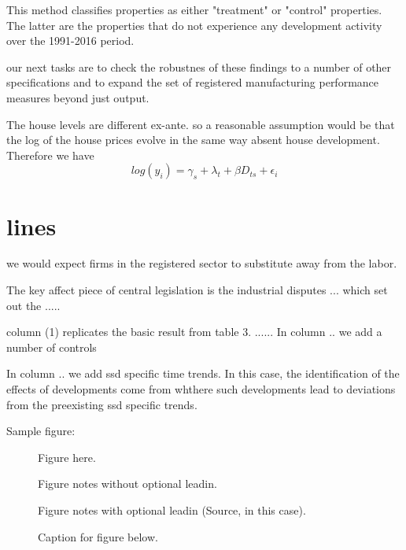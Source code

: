 \documentclass[AEJ]{AEA}
\begin{document}
This method classifies properties as either "treatment" or "control" properties. The latter are the properties that do not experience any development activity over the 1991-2016  period. 


our next tasks are to check the robustnes of these findings to a number of other specifications and to expand the set of registered manufacturing performance measures beyond just output.




The house levels are different ex-ante. so a reasonable assumption would be that the log of the house prices evolve in the same way absent house development. Therefore we have $$ log(y_i) = \gamma_s + \lambda_t +\beta D_{ts} + \epsilon_i$$




\section{lines}
we would expect firms in the registered sector to substitute away from the labor. 

The key affect piece of central legislation is the industrial disputes ... which set out the .....

column (1) replicates the basic result from table 3. ...... In column .. we add a number of controls

In column .. we add ssd specific time trends. In this case, the identification of the effects of developments come from whthere such developments lead to deviations from the preexisting ssd specific trends. 





Sample figure:

\begin{figure}
Figure here.

\caption{Caption for figure below.}
\begin{figurenotes}
Figure notes without optional leadin.
\end{figurenotes}
\begin{figurenotes}[Source]
Figure notes with optional leadin (Source, in this case).
\end{figurenotes}
\end{figure}
\end{document}
